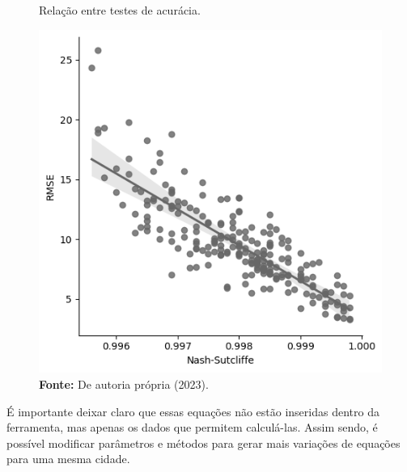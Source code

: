 \newpage

\begin{figure}[!ht]
	\centering
	\caption{ Relação entre testes de acurácia.}
	\includegraphics[width=.5\linewidth]{figuras/relacao_entre_testes_de_acuracia.png}
	\caption*{\textbf{Fonte:} De autoria própria (2023).}
	\label{fig:figuras/relacao_entre_testes_de_acuracia.png}
\end{figure}

É importante deixar claro que essas equações não estão inseridas dentro da ferramenta, mas apenas os dados que permitem calculá-las. Assim sendo, é possível modificar parâmetros e métodos para gerar mais variações de equações para uma mesma cidade.

